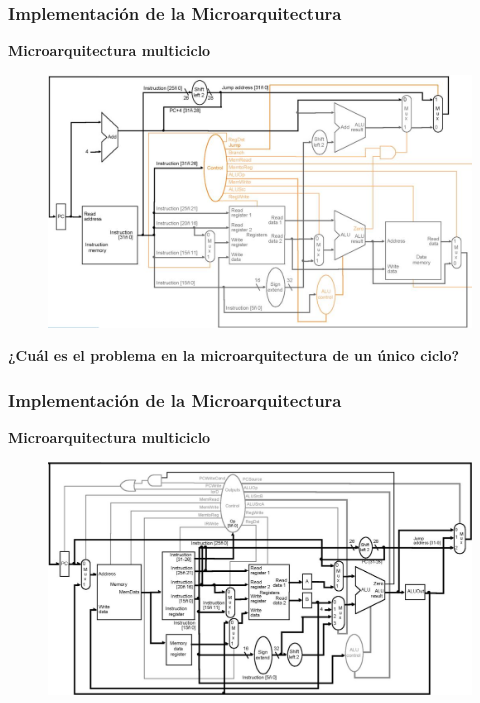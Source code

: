 \documentclass[aspectratio=169,compress]{beamer}
\begin{document}
\begin{footnotesize}
\begin{frame}
\frametitle{Implementación de la Microarquitectura}
\begin{center}\textbf{Microarquitectura multiciclo}\end{center}
\begin{figure}
\includegraphics[scale=0.2]{images/cpu-signals-2.jpg} 
\end{figure}
\begin{center}
\textbf{¿Cuál es el problema en la microarquitectura de un único ciclo?}
\end{center}

\end{frame}

\begin{frame}
\frametitle{Implementación de la Microarquitectura}
\begin{center}\textbf{Microarquitectura multiciclo}\end{center}
\begin{figure}
\includegraphics[scale=0.3]{images/cpu-multiciclo.jpg} 
\end{figure}
\end{frame}



\end{footnotesize}
\end{document}
